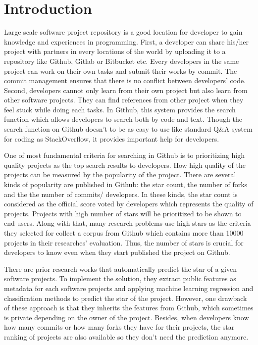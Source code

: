 \section{Introduction}
Large scale software project repository is a good location for developer to gain knowledge and experiences in programming. First, a developer can share his/her project with partners in every locations of the world by uploading it to a repository like Github, Gitlab or Bitbucket etc. Every developers in the same project can work on their own tasks and submit their works by commit. The commit management ensures that there is no conflict between developers' code. Second, developers cannot only learn from their own project but also learn from other software projects. They can find references from other project when they feel stuck while doing each tasks. In Github, this system provides the search function which allows developers to search both by code and text. Though the search function on Github doesn't to be as easy to use like standard Q\&A system for coding as StackOverflow, it provides important help for developers.

One of most fundamental criteria for searching in Github is to prioritizing high quality projects as the top search results to developers. How high quality of the projects can be measured by the popularity of the project. There are several kinds of popularity are published in Github: the star count, the number of forks and the the number of commits/ developers. In these kinds, the star count is considered as the official score voted by developers which represents the quality of projects. Projects with high number of stars will be prioritized to be shown to end users. Along with that, many research problems use high stars as the criteria they selected for collect a corpus from Github which contains more than 10000 projects in their researches' evaluation. Thus, the number of stars is crucial for developers to know even when they start published the project on Github.

There are prior research works that automatically predict the star of a given software projects. To implement the solution, they extract public features as metadata for each software projects and applying machine learning regression and classification methods to predict the star of the project.  However, one drawback of these approach is that they inherits the features from Github, which sometimes is private depending on the owner of the project. Besides, when developers know how many commits or how many forks they have for their projects, the star ranking of projects are also available so they don't need the prediction anymore.


